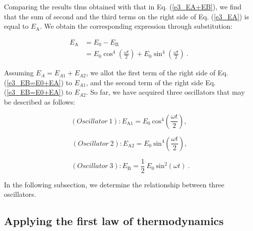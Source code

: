 \documentclass[%
 reprint,
 amsmath,amssymb,
 aps,
]{revtex4-1}
\numberwithin{equation}{section}
\begin{document}
    Comparing the results thus obtained with that in Eq. (\ref{e3_EA+EB}), we find that the sum of second and the third terms on the right side of Eq. (\ref{e3_EA}) is equal to $E_{\mathrm{A}}$. We obtain the corresponding expression through substitution:

        \begin{equation}
            \begin{split}
                E_{\mathrm{A}}
                    &= E_{0} - E_{\mathrm{B}} \\
                    &= E_{0} \cos^{4}  \left( \frac{\omega t}{2} \right) + E_{0} \sin^{4} \left( \frac{\omega t}{2} \right)
                    \ .
                    \label{e3_EB=E0+EA}
            \end{split}
        \end{equation}

    Assuming $E_{A}=E_{A1}+E_{A2}$, we allot the first term of the right side of Eq. (\ref{e3_EB=E0+EA}) to $E_{A1}$, and the second term of the right side Eq. (\ref{e3_EB=E0+EA}) to $E_{A2}$. So far, we have acquired three oscillators that may be described as follows:

        \begin{equation}
            (Oscillator \ 1): E_{\mathrm{A1}} = E_{0} \ \mathrm{cos}^{4} \left( \frac{\omega t}{2} \right)
            ,
            \label{e3_Osc_1}
        \end{equation}

        \begin{equation}
            \ (Oscillator \ 2): E_{\mathrm{A2}} = E_{0} \ \mathrm{sin}^{4} \left( \frac{\omega t}{2} \right)
            \label{e3_Osc_2}
            ,
        \end{equation}

        \begin{equation}
            \ \ (Oscillator \ 3): E_{\mathrm{B}} = \frac{1}{2} \ E_{0} \ \mathrm{sin}^{2} (\omega t)
            \ .
            \label{e3_Osc_3}
        \end{equation}

    In the following subsection, we determine the relationship between three oscillators.

\subsection{Applying the first law of thermodynamics}
\label{Applying_the_first_law_of_thermodynamics}
\end{document}
